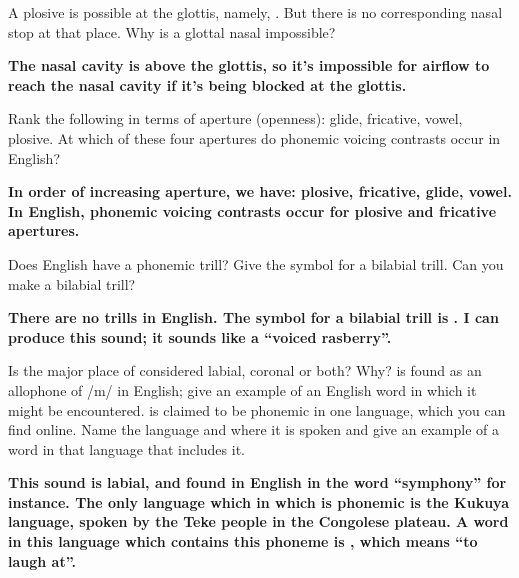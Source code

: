 \documentclass{../../templates/lkx_pset}
\begin{document}
\begin{problem}{6}
  A plosive is possible at the glottis, namely, \textipa{[P]}. But there is no corresponding nasal stop at that place. Why is a glottal nasal impossible?
\end{problem}

\begin{solution}
  \bfseries
  The nasal cavity is above the glottis, so it's impossible for airflow to reach the nasal cavity if it's being blocked at the glottis.
\end{solution}

\begin{problem}{7}
  Rank the following in terms of aperture (openness): glide, fricative, vowel, plosive. At which of these four apertures do phonemic voicing contrasts occur in English?
\end{problem}

\begin{solution}
  \bfseries
  In order of increasing aperture, we have: plosive, fricative, glide, vowel. In English, phonemic voicing contrasts occur for plosive and fricative apertures.
\end{solution}

\begin{problem}{8}
  Does English have a phonemic trill? Give the symbol for a bilabial trill. Can you make a bilabial trill?
\end{problem}

\begin{solution}
  \bfseries 
  There are no trills in English. The symbol for a bilabial trill is \textipa{[\;B]}. I can produce this sound; it sounds like a ``voiced rasberry''.
\end{solution}

\begin{problem}{9}
  Is the major place of \textipa{[M]} considered labial, coronal or both? Why? \textipa{[M]} is found as an allophone of /m/ in English; give an example of an English word in which it might be encountered.  is claimed to be phonemic in one language, which you can find online. Name the language and where it is spoken and give an example of a word in that language that includes it.
\end{problem}

\begin{solution}
  \bfseries
  This sound is labial, and found in English in the word ``symphony'' for instance. The only language which in which \textipa{[M]} is phonemic is the Kukuya language, spoken by the Teke people in the Congolese plateau. A word in this language which contains this phoneme is , which means ``to laugh at''.
\end{solution}
\end{document}
